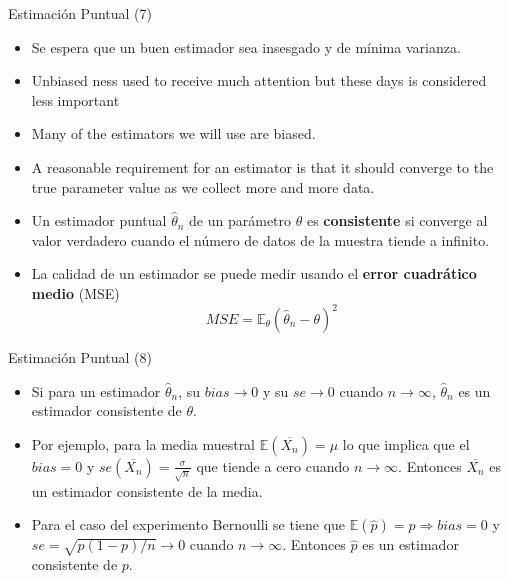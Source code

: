 \documentclass[handout]{beamer}
\begin{document}
\begin{frame}{Estimación Puntual (7)}

\scriptsize{

\begin{itemize}
\item Se espera que un buen estimador sea insesgado y de mínima varianza.

\item Unbiased ness used to receive much attention but these days is considered less important

\item Many of the estimators we will use are biased. 

\item A reasonable requirement for an estimator is that it should converge to the true parameter value as we collect more and more data.

\item Un estimador puntual $\hat{\theta}_n$ de un parámetro $\theta$ es \textbf{consistente} si converge al valor verdadero cuando el número de datos de la muestra tiende a infinito.
\item La calidad de un estimador se puede medir usando el \textbf{error cuadrático medio} (MSE)
\begin{displaymath}
MSE = \mathbb{E}_{\theta}(\hat{\theta}_n - \theta)^2 
\end{displaymath}

\end{itemize}

} 
\end{frame}



\begin{frame}{Estimación Puntual (8)}

\scriptsize{

\begin{itemize}
\item Si para un estimador $\hat{\theta}_n$, su $bias \rightarrow 0$ y su $se \rightarrow 0$ cuando $n\rightarrow \infty$, $\hat{\theta}_n$ es un estimador consistente de $\theta$.

\item Por ejemplo, para la media muestral $\mathbb{E}(\overline{X_{n}})=\mu$ lo que implica que el $bias =0$ y $se(\overline{X_{n}}) = \frac{\sigma}{\sqrt{n}}$ que tiende a cero cuando $n\rightarrow \infty$. Entonces $\overline{X_{n}}$ es un estimador consistente de la media.  

\item Para el caso del experimento Bernoulli se tiene que $\mathbb{E}(\hat{p})=p \Rightarrow bias=0$ y $se = \sqrt{p(1-p)/n} \rightarrow 0$ cuando $n\rightarrow \infty$. Entonces $\hat{p}$ es un estimador consistente de $p$.


\end{itemize}

} 
\end{frame}
\end{document}
